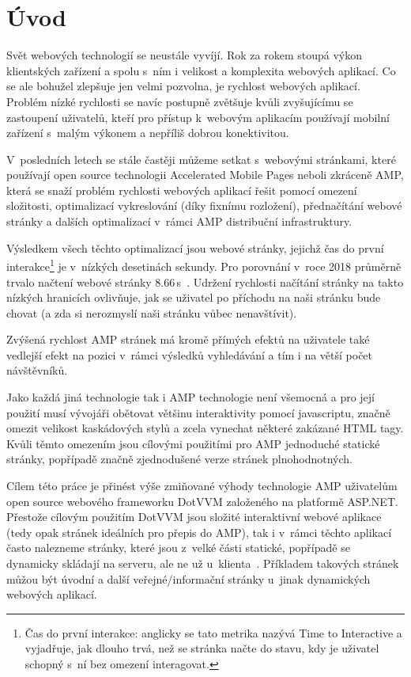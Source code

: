 \chapter{Úvod}

Svět webových technologií se neustále vyvíjí. Rok za rokem stoupá výkon klientských zařízení a spolu
s~ním i velikost a komplexita webových aplikací. Co se ale bohužel zlepšuje jen velmi pozvolna, je rychlost
webových aplikací. Problém nízké rychlosti se navíc postupně zvětšuje kvůli zvyšujícímu se zastoupení
uživatelů, kteří pro přístup k~webovým aplikacím používají mobilní zařízení s~malým výkonem a nepříliš
dobrou konektivitou.

V~posledních letech se stále častěji můžeme setkat s~webovými stránkami, které používají open source technologii Accelerated Mobile Pages neboli zkráceně AMP, která se snaží problém rychlosti webových aplikací
řešit pomocí omezení složitosti, optimalizací vykreslování (díky fixnímu rozložení), přednačítání webové
stránky a dalších optimalizací v~rámci AMP distribuční infrastruktury.

Výsledkem všech těchto optimalizací jsou webové stránky, jejichž čas do první interakce\footnote{Čas do první interakce: anglicky se tato metrika nazývá Time to Interactive a vyjadřuje, jak dlouho trvá, než se stránka načte do stavu, kdy je uživatel schopný s~ní bez omezení interagovat.} je v~nízkých desetinách sekundy. Pro porovnání v~roce 2018 průměrně trvalo načtení webové
stránky 8.66\,s~\cite{TTI}.
Udržení rychlosti načítání stránky na takto nízkých hranicích ovlivňuje, jak se uživatel po příchodu na naši
stránku bude chovat (a zda si nerozmyslí naši stránku vůbec nenavštívit).

Zvýšená rychlost AMP stránek má kromě přímých efektů na uživatele také vedlejší efekt na pozici
v~rámci výsledků vyhledávání a tím i na větší počet návštěvníků.

Jako každá jiná technologie tak i AMP technologie není všemocná a pro její použití musí vývojáři
obětovat většinu interaktivity pomocí javascriptu, značně omezit velikost kaskádových stylů a zcela
vynechat některé zakázané HTML tagy. Kvůli těmto omezením jsou cílovými použitími pro AMP jednoduché statické stránky, popřípadě značně
zjednodušené verze stránek plnohodnotných.

Cílem této práce je přinést výše zmiňované výhody technologie AMP uživatelům open source webového
frameworku DotVVM založeného na platformě ASP.NET.
Přestože cílovým použitím DotVVM jsou složité interaktivní webové aplikace (tedy opak stránek ideálních pro přepis do AMP), tak i v~rámci těchto aplikací často nalezneme stránky, které jsou z~velké části statické, popřípadě se dynamicky skládají na serveru, ale ne už u~klienta~\cite{DotVVMIntro}. Příkladem takových stránek můžou být úvodní a další veřejné/informační stránky u~jinak dynamických webových aplikací. 

